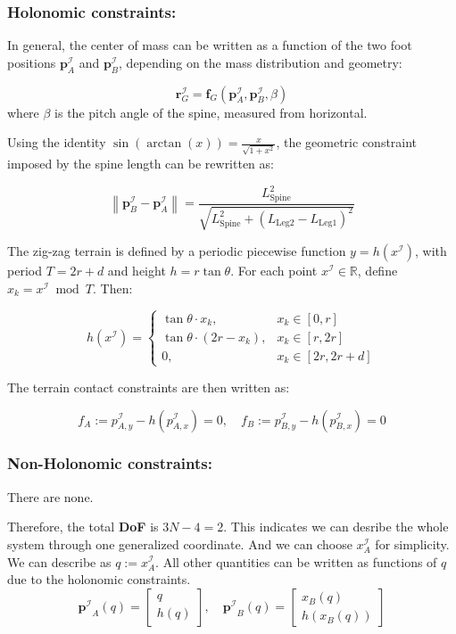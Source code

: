 \documentclass[11pt]{article}
\begin{document}
\subsubsection{Holonomic constraints:}
In general, the center of mass can be written as a function of the two foot positions \( \mathbf{p}_A^\mathcal{I} \) and \( \mathbf{p}_B^\mathcal{I} \), depending on the mass distribution and geometry:

\[
\mathbf{r}_G^\mathcal{I} = \mathbf{f}_G\left( \mathbf{p}_A^\mathcal{I}, \mathbf{p}_B^\mathcal{I} , \beta \right)
\]
where \( \beta \) is the pitch angle of the spine, measured from horizontal.

Using the identity \( \sin(\arctan(x)) = \frac{x}{\sqrt{1 + x^2}} \), the geometric constraint imposed by the spine length can be rewritten as:

\[
\left\| \mathbf{p}_B^\mathcal{I} - \mathbf{p}_A^\mathcal{I} \right\| =
\frac{L_\text{Spine}^2}{\sqrt{L_\text{Spine}^2 + \left(L_{\text{Leg}2} - L_{\text{Leg}1}\right)^2}}
\]

The zig-zag terrain is defined by a periodic piecewise function \( y = h(x^\mathcal{I}) \), with period \( T = 2r + d \) and height \( h = r \tan\theta \). For each point \( x^\mathcal{I} \in \mathbb{R} \), define \( x_k = x^\mathcal{I} \bmod T \). Then:

\[
h(x^\mathcal{I}) =
\begin{cases}
\tan\theta \cdot x_k, & x_k \in [0, r] \\
\tan\theta \cdot (2r - x_k), & x_k \in [r, 2r] \\
0, & x_k \in [2r, 2r + d]
\end{cases}
\]

The terrain contact constraints are then written as:

\[
f_A := p_{A,y}^\mathcal{I} - h(p_{A,x}^\mathcal{I}) = 0, \quad
f_B := p_{B,y}^\mathcal{I} - h(p_{B,x}^\mathcal{I}) = 0
\]

\subsubsection{Non-Holonomic constraints:}
\indent \indent There are none.

\vspace{10pt}
Therefore, the total \textbf{DoF} is \(3N-4 =2\). This indicates we can desribe the whole system through one generalized
coordinate. And we can choose \(x_{A}^{\mathcal{I}}\) for simplicity. We can describe as \( q := x_A^\mathcal{I} \). All other quantities can be written as functions of \( q \) due to the holonomic constraints.
\[
\mathbf{p^\mathcal{I}}_A(q) =
\begin{bmatrix}
q \\
h(q)
\end{bmatrix}, \quad
\mathbf{p^\mathcal{I}}_B(q) =
\begin{bmatrix}
x_B(q) \\
h(x_B(q))
\end{bmatrix}
\]
\end{document}
